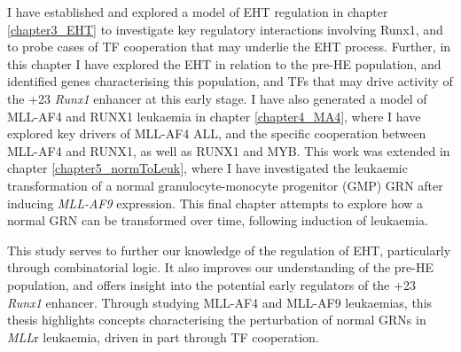 \vspace*{-5mm}
I have established and explored a model of EHT regulation in chapter \ref{chapter3_EHT} to investigate key regulatory interactions involving Runx1, and to probe cases of TF cooperation that may underlie the EHT process. Further, in this chapter I have explored the EHT in relation to the pre-HE population, and identified genes characterising this population, and TFs that may drive activity of the +23 \textit{Runx1} enhancer at this early stage. I have also generated a model of MLL-AF4 and RUNX1 leukaemia in chapter  \ref{chapter4_MA4}, where I have explored key drivers of MLL-AF4 ALL, and the specific cooperation between MLL-AF4 and RUNX1, as well as RUNX1 and MYB. This work was extended in chapter \ref{chapter5_normToLeuk}, where I have investigated the leukaemic transformation of a normal granulocyte-monocyte progenitor (GMP) GRN after inducing \textit{MLL-AF9} expression. This final chapter attempts to explore how a normal GRN can be transformed over time, following induction of leukaemia. 

This study serves to further our knowledge of the regulation of EHT, particularly through combinatorial logic. It also improves our understanding of the pre-HE population, and offers insight into the potential early regulators of the +23 \textit{Runx1} enhancer. Through studying MLL-AF4 and MLL-AF9 leukaemias, this thesis highlights concepts characterising the perturbation of normal GRNs in \textit{MLL}r leukaemia, driven in part through TF cooperation.






















